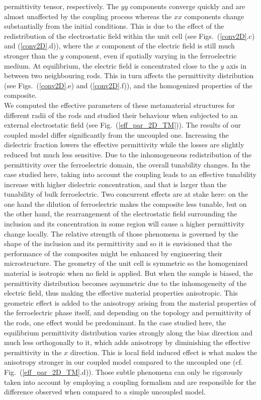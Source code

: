 \documentclass[aps,prb,11pt]{revtex4-1}
\newcommand{\fig}[1]{Fig.~(\ref{#1})}
\begin{document}
permittivity tensor, respectively. The $yy$ components converge quickly
and are almost unaffected by the coupling process whereas the
$xx$ components change substantially from the initial conditions.
This is due to the effect of the redistribution
of the electrostatic field within the unit cell (see Figs.~(\ref{conv2D}.c) and (\ref{conv2D}.d)),
where the $x$ component of the electric field is still much stronger
than the $y$ component, even if spatially varying in the ferroelectric medium.
At equilibrium, the electric field is concentrated close to the $y$ axis in between two neighbouring
rods. This in turn affects the permittivity distribution (see Figs.~(\ref{conv2D}.e) and (\ref{conv2D}.f)),
and the homogenized properties of the composite.\\
We computed the effective parameters of these metamaterial structures for different
radii of the rods and studied their behaviour when subjected to an external
electrostatic field (see \fig{eff_par_2D_TM}). The results of our coupled
model differ significantly from the uncoupled one. Increasing the dielectric fraction
lowers the effective permittivity while the losses are slightly reduced but much less sensitive.
Due to the inhomogeneous redistribution of the permittivity over the ferroelectric domain, the
overall tunability changes. In the case studied here, taking into account
the coupling leads to an effective tunability increase with
higher dielectric concentration, and that is larger than the tunability
 of bulk ferroelectric. Two concurrent effects are at stake here: on the one hand
the dilution of ferroelectric makes the composite less tunable, but on the other hand,
the rearrangement of the electrostatic field surrounding the inclusion and its
concentration in some region will cause a higher permittivity change locally.
The relative strength of those phenomena is governed by the shape of the inclusion and its permittivity
and so it is envisioned that the performance of the composites might be enhanced by engineering
their microstructure.
The geometry of the unit cell is symmetric so the homogenized material is
isotropic when no field is applied.
But when the sample is biased, the permittivity distribution becomes asymmetric due
to the inhomogeneity of the electric field, thus making the effective material properties anisotropic.
This geometric effect is added to the anisotropy arising from the material properties of the ferroelectric
phase itself, and depending on the topology and permittivity of the rods, one effect would be predominant.
In the case studied here, the equilibrium permittivity distribution varies strongly along the bias
 direction and much less orthogonally to it, which adds anisotropy by diminishing the effective
 permittivity in the $x$ direction. This is local field induced effect is what makes the anisotropy stronger
 in our coupled model compared to the uncoupled one (cf. Fig.~(\ref{eff_par_2D_TM}.d)).
Those subtle phenomena can only be rigorously taken into account by employing a coupling formalism
and are responsible for the difference observed when compared to a simple uncoupled model.\\
\end{document}
